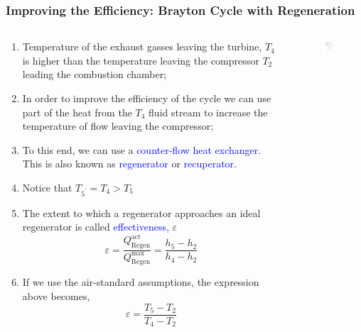 \documentclass[10pt,compress]{beamer}
\newcommand{\frc}{\displaystyle\frac}
\begin{document}
\begin{frame}
 \frametitle{Improving the Efficiency: Brayton Cycle with Regeneration}
 \begin{columns}
   \begin{column}[c]{0.5\linewidth} 
      \begin{enumerate}[(1)]\scriptsize
        \item<1-> Temperature of the exhaust gasses leaving the turbine, $T_{4}$ is higher than the temperature leaving the compressor $T_{2}$ leading the combustion chamber;
        \item<2-> In order to improve the efficiency of the cycle we can use part of the heat from the $T_{4}$ fluid stream to increase the temperature of flow leaving the compressor;
        \item<3-> To this end, we can use a \textcolor{blue}{counter-flow heat exchanger}. This is also known as \textcolor{blue}{regenerator} or \textcolor{blue}{recuperator}.
        \item<4-> Notice that $T_{5^{\prime}}=T_{4}>T_{5}$
        \item<4-> The extent to which a regenerator approaches an ideal regenerator is called \textcolor{blue}{effectiveness}, $\varepsilon$
          \begin{displaymath}
             \varepsilon=\frc{Q_{\text{Regen}}^{\text{act}}}{Q_{\text{Regen}}^{\text{max}}} = \frc{h_{5}-h_{2}}{h_{4}-h_{2}}
          \end{displaymath}
        \item<5-> If we use the air-standard assumptions, the expression above becomes,
          \begin{displaymath}
            \varepsilon= \frc{T_{5}-T_{2}}{T_{4}-T_{2}}
          \end{displaymath}  
       \end{enumerate}
  \end{column}
  \begin{column}[c]{0.5\linewidth}
    \begin{center}
   \begin{figure}%
     \includegraphics[height=5.cm,width=4.5cm,clip]{./Pics/Brayton_cycle4}
   \end{figure}  
    \end{center}
  \end{column}  
 \end{columns}
\end{frame}
\end{document}
